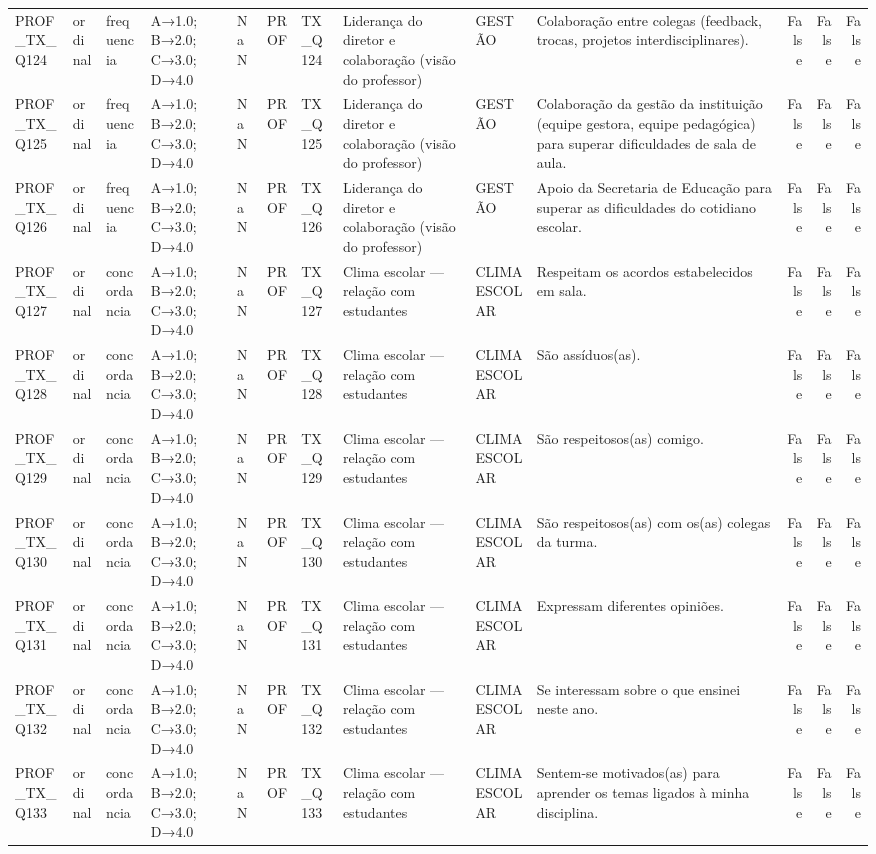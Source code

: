 \begin{tabular}{llllllllllrrr}
PROF\_TX\_Q124 & ordinal & frequencia & A→1.0; B→2.0; C→3.0; D→4.0 & NaN & PROF & TX\_Q124 & Liderança do diretor e colaboração (visão do professor) & GESTÃO & Colaboração entre colegas (feedback, trocas, projetos interdisciplinares). & False & False & False \\
PROF\_TX\_Q125 & ordinal & frequencia & A→1.0; B→2.0; C→3.0; D→4.0 & NaN & PROF & TX\_Q125 & Liderança do diretor e colaboração (visão do professor) & GESTÃO & Colaboração da gestão da instituição (equipe gestora, equipe pedagógica) para superar dificuldades de sala de aula. & False & False & False \\
PROF\_TX\_Q126 & ordinal & frequencia & A→1.0; B→2.0; C→3.0; D→4.0 & NaN & PROF & TX\_Q126 & Liderança do diretor e colaboração (visão do professor) & GESTÃO & Apoio da Secretaria de Educação para superar as dificuldades do cotidiano escolar. & False & False & False \\
PROF\_TX\_Q127 & ordinal & concordancia & A→1.0; B→2.0; C→3.0; D→4.0 & NaN & PROF & TX\_Q127 & Clima escolar — relação com estudantes & CLIMA ESCOLAR & Respeitam os acordos estabelecidos em sala. & False & False & False \\
PROF\_TX\_Q128 & ordinal & concordancia & A→1.0; B→2.0; C→3.0; D→4.0 & NaN & PROF & TX\_Q128 & Clima escolar — relação com estudantes & CLIMA ESCOLAR & São assíduos(as). & False & False & False \\
PROF\_TX\_Q129 & ordinal & concordancia & A→1.0; B→2.0; C→3.0; D→4.0 & NaN & PROF & TX\_Q129 & Clima escolar — relação com estudantes & CLIMA ESCOLAR & São respeitosos(as) comigo. & False & False & False \\
PROF\_TX\_Q130 & ordinal & concordancia & A→1.0; B→2.0; C→3.0; D→4.0 & NaN & PROF & TX\_Q130 & Clima escolar — relação com estudantes & CLIMA ESCOLAR & São respeitosos(as) com os(as) colegas da turma. & False & False & False \\
PROF\_TX\_Q131 & ordinal & concordancia & A→1.0; B→2.0; C→3.0; D→4.0 & NaN & PROF & TX\_Q131 & Clima escolar — relação com estudantes & CLIMA ESCOLAR & Expressam diferentes opiniões. & False & False & False \\
PROF\_TX\_Q132 & ordinal & concordancia & A→1.0; B→2.0; C→3.0; D→4.0 & NaN & PROF & TX\_Q132 & Clima escolar — relação com estudantes & CLIMA ESCOLAR & Se interessam sobre o que ensinei neste ano. & False & False & False \\
PROF\_TX\_Q133 & ordinal & concordancia & A→1.0; B→2.0; C→3.0; D→4.0 & NaN & PROF & TX\_Q133 & Clima escolar — relação com estudantes & CLIMA ESCOLAR & Sentem-se motivados(as) para aprender os temas ligados à minha disciplina. & False & False & False \\

\end{tabular}
